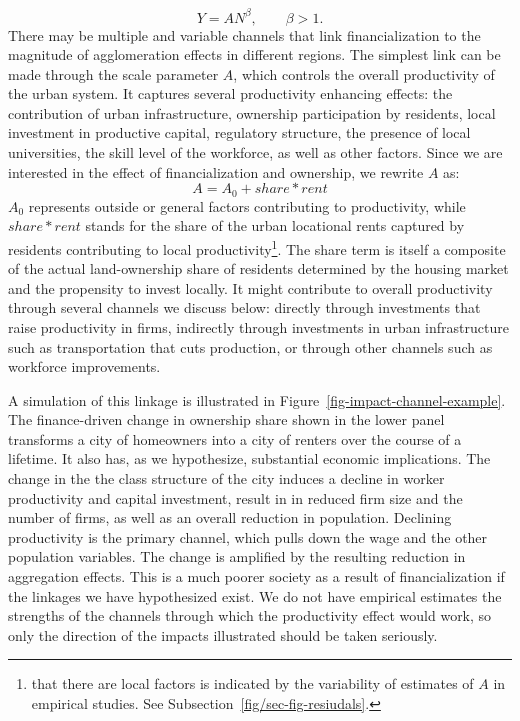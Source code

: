 \begin{equation}\label{eq-agglom-eqn2}
    Y=AN^\beta,\qquad \beta>1. 
\end{equation}
There may be multiple and variable channels that link financialization to the magnitude of agglomeration effects in different regions. 
The simplest link can be made through the scale parameter $A$, which controls the overall productivity of the urban system. It captures several productivity enhancing effects: the contribution of urban infrastructure, ownership participation by residents, local investment in productive capital, regulatory structure, the presence of local universities, the skill level of the workforce, as well as other factors. 
Since we are interested in the effect of financialization and ownership, we rewrite $A$ as:
\[ A= A_0 + share * rent\]
$A_0$ represents outside or general factors contributing to productivity, while $share*rent$ stands for the share of the urban locational rents captured by residents contributing to local productivity\footnote{that there are local factors is indicated by the variability of estimates of $A$ in empirical studies. See Subsection~\ref{fig/sec-fig-resiudals}.}. The share term is itself a composite of the actual land-ownership share of residents determined by the housing market and the propensity to invest locally.  It might contribute to overall productivity through several channels we discuss below:  directly through investments that raise productivity in firms, indirectly through investments in urban infrastructure such as transportation that cuts production, or through other channels such as workforce improvements. 

A simulation of this linkage is illustrated in Figure~\ref{fig-impact-channel-example}. The finance-driven change in ownership share shown in the lower panel transforms  a city of homeowners  into a city of renters over the course of a lifetime. It also has, as we hypothesize, substantial economic implications. The change in the the class structure of the city induces a decline in worker productivity and capital investment, result in in reduced firm size and the number of firms, as well as an overall reduction in population. Declining productivity is the primary channel, which pulls down the wage and the other population variables. The change is amplified by the resulting reduction in aggregation effects. This is a much poorer society as a result of financialization if the linkages we have hypothesized exist. We do not have empirical estimates the strengths of the channels through which the productivity effect would work, so only the direction of the impacts illustrated should be taken seriously.  

